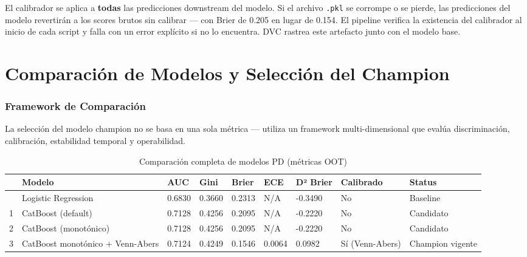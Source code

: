 \documentclass[
  spanish,
  11pt,
  letterpaper,
]{scrbook}
\theoremstyle{plain}
\theoremstyle{remark}
\begin{document}
\begin{tcolorbox}[enhanced jigsaw, arc=.35mm, bottomrule=.15mm, bottomtitle=1mm, breakable, colback=white, colbacktitle=quarto-callout-warning-color!10!white, colframe=quarto-callout-warning-color-frame, coltitle=black, left=2mm, leftrule=.75mm, opacityback=0, opacitybacktitle=0.6, rightrule=.15mm, title=\textcolor{quarto-callout-warning-color}{\faExclamationTriangle}\hspace{0.5em}{El calibrador es un artefacto crítico}, titlerule=0mm, toprule=.15mm, toptitle=1mm]

El calibrador se aplica a \textbf{todas} las predicciones downstream del
modelo. Si el archivo \texttt{.pkl} se corrompe o se pierde, las
predicciones del modelo revertirán a los scores brutos sin calibrar ---
con Brier de 0.205 en lugar de 0.154. El pipeline verifica la existencia
del calibrador al inicio de cada script y falla con un error explícito
si no lo encuentra. DVC rastrea este artefacto junto con el modelo base.

\end{tcolorbox}

\chapter{Comparación de Modelos y Selección del
Champion}\label{sec-model-champion}

\subsection{Framework de Comparación}\label{framework-de-comparaciuxf3n}

La selección del modelo champion no se basa en una sola métrica ---
utiliza un framework multi-dimensional que evalúa discriminación,
calibración, estabilidad temporal y operabilidad.

{

\begin{longtable}[]{@{}lllllllll@{}}

\caption{\label{tbl-model-comparison-full}Comparación completa de
modelos PD (métricas OOT)}

\tabularnewline

\toprule\noalign{}
& Modelo & AUC & Gini & Brier & ECE & D² Brier & Calibrado & Status \\
\midrule\noalign{}
\endhead
\bottomrule\noalign{}
\endlastfoot
0 & Logistic Regression & 0.6830 & 0.3660 & 0.2313 & N/A & -0.3490 & No
& Baseline \\
1 & CatBoost (default) & 0.7128 & 0.4256 & 0.2095 & N/A & -0.2220 & No &
Candidato \\
2 & CatBoost (monotónico) & 0.7128 & 0.4256 & 0.2095 & N/A & -0.2220 &
No & Candidato \\
3 & CatBoost monotónico + Venn-Abers & 0.7124 & 0.4249 & 0.1546 & 0.0064
& 0.0982 & Sí (Venn-Abers) & Champion vigente \\

\end{longtable}

}
\end{document}
